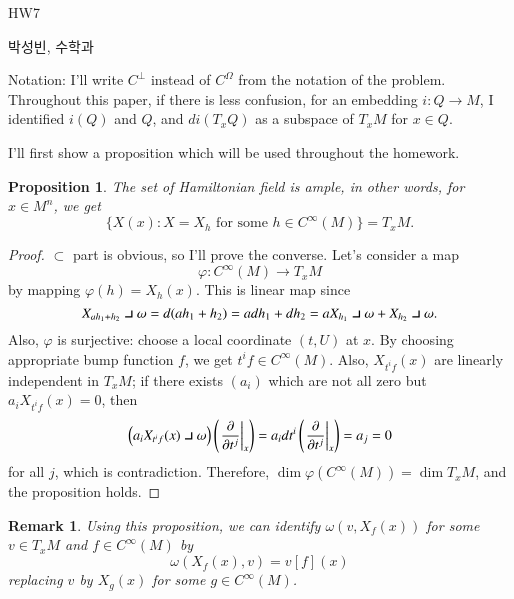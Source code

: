 \documentclass[a4paper, 12pt]{article}
\theoremstyle{Mydefinition}
\newtheorem{remark}[statement]{Remark}
\theoremstyle{Mytheorem}
\newtheorem{proposition}[statement]{Proposition}
\newcommand{\intprodl}{%
    \mathbin{\scalebox{1.5}{$\lrcorner$}}%
}
\begin{document}
\thispagestyle{myfirstpage}
\begin{center}
    \Large{HW7}
\end{center}
박성빈, 수학과

Notation: I'll write $C^\perp$ instead of $C^\Omega$ from the notation of the problem. Throughout this paper, if there is less confusion, for an embedding $i:Q\rightarrow M$, I identified $i(Q)$ and $Q$, and $di(T_xQ)$ as a subspace of $T_xM$ for $x\in Q$.

I'll first show a proposition which will be used throughout the homework.
\begin{proposition}\label{HW7:Prop1}
The set of Hamiltonian field is ample, in other words, for $x\in M^n$, we get
\begin{equation*}
    \{X(x):X=X_h\textrm{ for some }h\in C^\infty(M)\} = T_xM.
\end{equation*}
\end{proposition}
\begin{proof}
$\subset$ part is obvious, so I'll prove the converse. Let's consider a map
\begin{equation*}
    \varphi:C^\infty(M)\rightarrow T_xM
\end{equation*}
by mapping $\varphi(h) = X_h(x)$. This is linear map since
\begin{equation*}
    X_{ah_1+h_2}\intprodl \omega = d(ah_1+h_2) = adh_1+dh_2 = aX_{h_1}\intprodl \omega + X_{h_2}\intprodl \omega.
\end{equation*}
Also, $\varphi$ is surjective: choose a local coordinate $(t, U)$ at $x$. By choosing appropriate bump function $f$, we get $t^i f\in C^\infty(M)$. Also, $X_{t^i f}(x)$ are linearly independent in $T_xM$; if there exists $(a_i)$ which are not all zero but $a_iX_{t^i f}(x) = 0$, then
\begin{equation*}
    \left(a_iX_{t^i f}(x) \intprodl \omega\right)\left(\left.\pdv{t^j}\right|_x\right) = a_i dt^i\left(\left.\pdv{t^j}\right|_x\right) = a_j = 0
\end{equation*}
for all $j$, which is contradiction. Therefore, $\dim \varphi(C^\infty(M)) = \dim T_xM$, and the proposition holds.
\end{proof}

\begin{remark}
Using this proposition, we can identify $\omega(v, X_f(x))$ for some $v\in T_xM$ and $f\in C^\infty(M)$ by
\begin{equation*}
    \omega(X_f(x), v) = v[f](x)
\end{equation*}
replacing $v$ by $X_g(x)$ for some $g\in C^\infty(M)$.
\end{remark}
\end{document}
